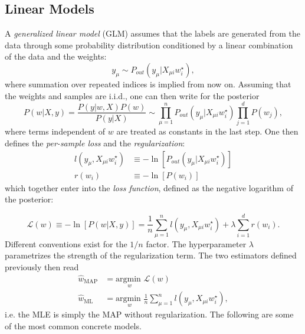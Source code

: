 \documentclass{article}
\begin{document}
\subsection{Linear Models}
A \emph{generalized linear model} (GLM) assumes that the labels are generated from the data through some probability distribution conditioned by a linear combination of the data and the weights:
\begin{equation}
    y_{\mu} \sim P_{out} (y_{\mu} | X_{\mu i} w^{\star}_i),
\end{equation}
where summation over repeated indices is implied from now on. Assuming that the weights and samples are i.i.d., one can then write for the posterior
\begin{equation}
    P(w | X,y)
    =
    \frac{P(y | w,X) P(w)}{P(y|X)}
    \sim
    \prod_{\mu = 1}^{n} P_{out} (y_{\mu} | X_{\mu i} w^{\star}_i)
    \prod_{j = 1}^{d} P(w_j),
    \label{eq:linearposterior}
\end{equation}
where terms independent of $w$ are treated as constants in the last step. One then defines the \emph{per-sample loss} and the \emph{regularization}:
\begin{align}
    l(y_{\mu}, X_{\mu i} w^{\star}_i)
    &\equiv
    - \ln \left[P_{out} (y_{\mu} | X_{\mu i} w^{\star}_i)\right]\\
    r(w_i) &\equiv
    - \ln \left[P(w_i) \right]
\end{align}
which together enter into the \emph{loss function}, defined as the negative logarithm of the posterior:

\begin{equation}
    \boxed{
        \mathcal{L}(w)
        \equiv
        - \ln \left[P(w | X,y)\right]
        =
        \frac{1}{n}\sum_{\mu = 1}^{n} l(y_{\mu}, X_{\mu i} w^{\star}_i)
        +
        \lambda \sum_{i=1}^{d} r(w_i).
    }
\end{equation}
Different conventions exist for the $1/n$ factor. The hyperparameter $\lambda$ parametrizes the strength of the regularization term. The two estimators defined previously then read
\begin{align}
    \hat{w}_{\text{MAP}} &= \underset{w}{\text{argmin }} \mathcal{L}(w) \\
    \hat{w}_{\text{ML}} &= \underset{w}{\text{argmin }} \frac{1}{n}\sum_{\mu = 1}^{n} l(y_{\mu}, X_{\mu i} w^{\star}_i),
\end{align}
i.e. the MLE is simply the MAP without regularization. The following are some of the most common concrete models.
\end{document}
